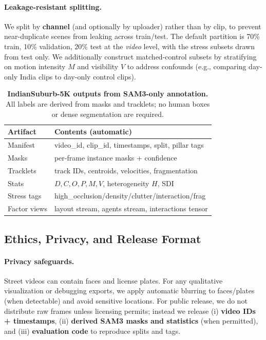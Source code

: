 \paragraph{Leakage-resistant splitting.}
We split by \textbf{channel} (and optionally by uploader) rather than by clip, to prevent near-duplicate scenes from leaking across train/test. The default partition is 70\% train, 10\% validation, 20\% test at the \emph{video} level, with the stress subsets drawn from test only. We additionally construct matched-control subsets by stratifying on motion intensity $M$ and visibility $V$ to address confounds (e.g., comparing day-only India clips to day-only control clips).

\begin{table}[t]
\centering
\small
\setlength{\tabcolsep}{4.5pt}
\renewcommand{\arraystretch}{1.12}
\caption{\textbf{IndianSuburb-5K outputs from SAM3-only annotation.} All labels are derived from masks and tracklets; no human boxes or dense segmentation are required.}
\label{tab:indiasuburb_outputs}
\begin{tabular}{l l}
\toprule
\textbf{Artifact} & \textbf{Contents (automatic)} \\
\midrule
Manifest & video\_id, clip\_id, timestamps, split, pillar tags \\
Masks & per-frame instance masks + confidence \\
Tracklets & track IDs, centroids, velocities, fragmentation \\
Stats & $D,C,O,P,M,V$, heterogeneity $H$, SDI \\
Stress tags & high\_occlusion/density/clutter/interaction/frag \\
Factor views & layout stream, agents stream, interactions tensor \\
\bottomrule
\end{tabular}
\end{table}

\subsection{Ethics, Privacy, and Release Format}
\label{sec:indiasuburb5k_ethics}

\paragraph{Privacy safeguards.}
Street videos can contain faces and license plates. For any qualitative visualization or debugging exports, we apply automatic blurring to faces/plates (when detectable) and avoid sensitive locations. For public release, we do not distribute raw frames unless licensing permits; instead we release (i) \textbf{video IDs + timestamps}, (ii) \textbf{derived SAM3 masks and statistics} (when permitted), and (iii) \textbf{evaluation code} to reproduce splits and tags.

